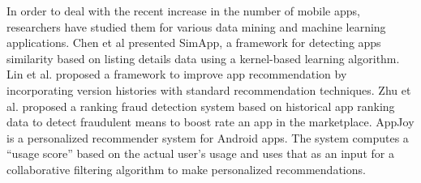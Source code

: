 In order to deal with the recent increase in the number of mobile apps, researchers have studied them for various data mining and machine learning applications.
Chen et al \cite{Chen_2015_WSDM} presented SimApp, a framework for detecting apps similarity based on listing details data using a kernel-based learning algorithm.
Lin et al. \cite{lin_2014_SIGIR} proposed a framework to improve app  recommendation by incorporating version histories with standard recommendation techniques.
Zhu et al. \cite{zhu_2013_CIKM} proposed a ranking fraud detection system based on historical app ranking data to detect fraudulent means to boost rate an app in the marketplace.
AppJoy \cite{yan_2011_MobiSys} is a personalized recommender system for Android apps.
The system computes a ``usage score'' based on the actual user's usage and uses that as an input for a collaborative filtering algorithm to make personalized recommendations.

